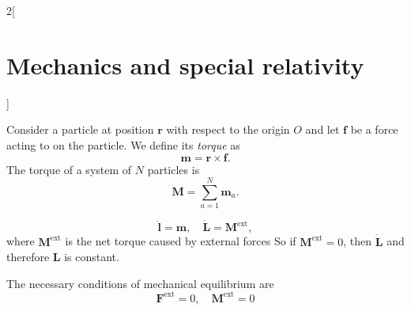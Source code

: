 \documentclass[class=article,10pt,crop=false]{standalone}
\begin{document}
\begin{multicols}{2}[\section{Mechanics and special relativity}]
\begin{concept}
\end{concept}
\begin{concept}[Torque]
Consider a particle at position $\boldsymbol{r}$ with respect to the origin $O$ and let $\boldsymbol{f}$ be a force acting to on the particle. We define its \textit{torque} as $$\boldsymbol{m}=\boldsymbol{r}\times\boldsymbol{f}.$$ The torque of a system of $N$ particles is $$\boldsymbol{M}=\sum_{a=1}^N\boldsymbol{m}_a.$$
\end{concept}
\begin{concept}
$$\dot{\boldsymbol{l}}=\boldsymbol{m},\quad\dot{\boldsymbol{L}}=\boldsymbol{M}^\text{ext},$$where $\boldsymbol{M}^\text{ext}$ is the net torque caused by external forces So if $\boldsymbol{M}^\text{ext}=0$, then $\dot{\boldsymbol{L}}$ and therefore $\boldsymbol{L}$ is constant.
\end{concept}
\begin{concept}
The necessary conditions of mechanical equilibrium are $$\boldsymbol{F}^\text{ext}=0,\quad\boldsymbol{M}^\text{ext}=0$$
\end{concept}

\end{multicols}
\end{document}
